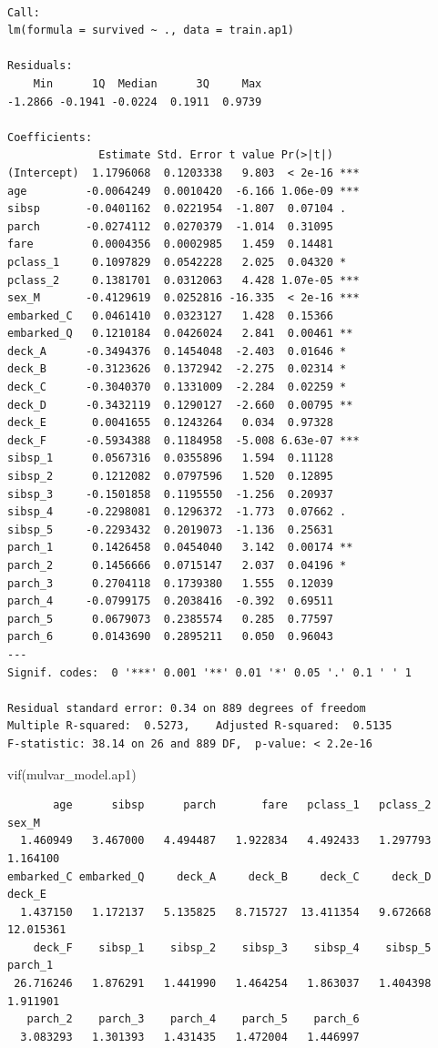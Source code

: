 \documentclass[
  letterpaper,
  DIV=11,
  numbers=noendperiod]{scrartcl}
\newenvironment{Shaded}{\begin{snugshade}}{\end{snugshade}}
\newcommand{\FunctionTok}[1]{\textcolor[rgb]{0.28,0.35,0.67}{#1}}
\newcommand{\NormalTok}[1]{\textcolor[rgb]{0.00,0.23,0.31}{#1}}
\begin{document}
\begin{verbatim}

Call:
lm(formula = survived ~ ., data = train.ap1)

Residuals:
    Min      1Q  Median      3Q     Max 
-1.2866 -0.1941 -0.0224  0.1911  0.9739 

Coefficients:
              Estimate Std. Error t value Pr(>|t|)    
(Intercept)  1.1796068  0.1203338   9.803  < 2e-16 ***
age         -0.0064249  0.0010420  -6.166 1.06e-09 ***
sibsp       -0.0401162  0.0221954  -1.807  0.07104 .  
parch       -0.0274112  0.0270379  -1.014  0.31095    
fare         0.0004356  0.0002985   1.459  0.14481    
pclass_1     0.1097829  0.0542228   2.025  0.04320 *  
pclass_2     0.1381701  0.0312063   4.428 1.07e-05 ***
sex_M       -0.4129619  0.0252816 -16.335  < 2e-16 ***
embarked_C   0.0461410  0.0323127   1.428  0.15366    
embarked_Q   0.1210184  0.0426024   2.841  0.00461 ** 
deck_A      -0.3494376  0.1454048  -2.403  0.01646 *  
deck_B      -0.3123626  0.1372942  -2.275  0.02314 *  
deck_C      -0.3040370  0.1331009  -2.284  0.02259 *  
deck_D      -0.3432119  0.1290127  -2.660  0.00795 ** 
deck_E       0.0041655  0.1243264   0.034  0.97328    
deck_F      -0.5934388  0.1184958  -5.008 6.63e-07 ***
sibsp_1      0.0567316  0.0355896   1.594  0.11128    
sibsp_2      0.1212082  0.0797596   1.520  0.12895    
sibsp_3     -0.1501858  0.1195550  -1.256  0.20937    
sibsp_4     -0.2298081  0.1296372  -1.773  0.07662 .  
sibsp_5     -0.2293432  0.2019073  -1.136  0.25631    
parch_1      0.1426458  0.0454040   3.142  0.00174 ** 
parch_2      0.1456666  0.0715147   2.037  0.04196 *  
parch_3      0.2704118  0.1739380   1.555  0.12039    
parch_4     -0.0799175  0.2038416  -0.392  0.69511    
parch_5      0.0679073  0.2385574   0.285  0.77597    
parch_6      0.0143690  0.2895211   0.050  0.96043    
---
Signif. codes:  0 '***' 0.001 '**' 0.01 '*' 0.05 '.' 0.1 ' ' 1

Residual standard error: 0.34 on 889 degrees of freedom
Multiple R-squared:  0.5273,    Adjusted R-squared:  0.5135 
F-statistic: 38.14 on 26 and 889 DF,  p-value: < 2.2e-16
\end{verbatim}

\begin{Shaded}
\begin{Highlighting}[]
\FunctionTok{vif}\NormalTok{(mulvar\_model.ap1)}
\end{Highlighting}
\end{Shaded}

\begin{verbatim}
       age      sibsp      parch       fare   pclass_1   pclass_2      sex_M 
  1.460949   3.467000   4.494487   1.922834   4.492433   1.297793   1.164100 
embarked_C embarked_Q     deck_A     deck_B     deck_C     deck_D     deck_E 
  1.437150   1.172137   5.135825   8.715727  13.411354   9.672668  12.015361 
    deck_F    sibsp_1    sibsp_2    sibsp_3    sibsp_4    sibsp_5    parch_1 
 26.716246   1.876291   1.441990   1.464254   1.863037   1.404398   1.911901 
   parch_2    parch_3    parch_4    parch_5    parch_6 
  3.083293   1.301393   1.431435   1.472004   1.446997 
\end{verbatim}
\end{document}
